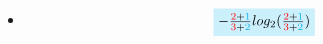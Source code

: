 \documentclass[xcolor=table]{beamer}
\begin{document}
\begin{frame}
\begin{itemize} \itemsep1pt \parskip0pt 
  \item[] {\scriptsize \begin{equation*}
        \tikz[baseline]{
            \node[fill=cyan!20,anchor=base]
            {$ -\frac{\color{red}{2}\color{black}{+}\color{cyan}{1}}{\color{red}{3}\color{black}{+}\color{cyan}{2}}log_2{(\frac{\color{red}{2}\color{black}{+}\color{cyan}{1}}{\color{red}{3}\color{black}{+}\color{cyan}{2}}})$};
        }
\end{equation*}}
  
\end{itemize}

\end{frame}
\end{document}

